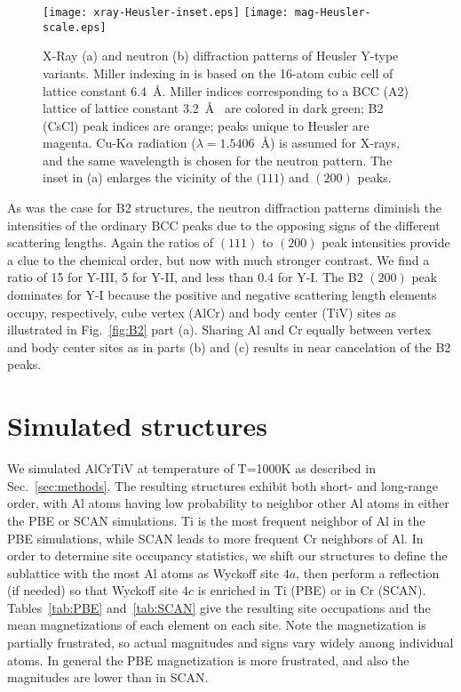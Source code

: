 \documentclass[twoside,12pt]{article}
\begin{document}
\begin{figure}[h!]
\texttt{[image: xray-Heusler-inset.eps]}
\texttt{[image: mag-Heusler-scale.eps]}
  \caption{\label{fig:Heusler} X-Ray (a) and neutron (b) diffraction patterns of Heusler Y-type variants. Miller indexing in is based on the 16-atom cubic cell of lattice constant 6.4~\AA. Miller indices corresponding to a BCC (A2) lattice of lattice constant 3.2~\AA~ are colored in dark green; B2 (CsCl) peak indices are orange; peaks unique to Heusler are magenta. Cu-K$\alpha$ radiation ($\lambda=1.5406$~\AA) is assumed for X-rays, and the same wavelength is chosen for the neutron pattern. The inset in (a) enlarges the vicinity of the $(111$) and $(200)$ peaks.}
\end{figure}

As was the case for B2 structures, the neutron diffraction patterns diminish the intensities of the ordinary BCC peaks due to the opposing signs of the different scattering lengths. Again the ratios of $(111)$ to $(200)$ peak intensities provide a clue to the chemical order, but now with much stronger contrast. We find a ratio of 15 for Y-III, 5 for Y-II, and less than 0.4 for Y-I. The B2 $(200)$ peak dominates for Y-I because the positive and negative scattering length elements occupy, respectively, cube vertex (AlCr) and body center (TiV) sites as illustrated in Fig.~\ref{fig:B2} part (a). Sharing Al and Cr equally between vertex and body center sites as in parts (b) and (c) results in near cancelation of the B2 peaks.


\section{Simulated structures}
\label{sec:sim}

We simulated AlCrTiV at temperature of T=1000K as described in Sec.~\ref{sec:methods}. The resulting structures exhibit both short- and long-range order, with Al atoms having low probability to neighbor other Al atoms in either the PBE or SCAN simulations. Ti is the most frequent neighbor of Al in the PBE simulations, while SCAN leads to more frequent Cr neighbors of Al. In order to determine site occupancy statistics, we shift our structures to define the sublattice with the most Al atoms as Wyckoff site $4a$, then perform a reflection (if needed) so that Wyckoff site $4c$ is enriched in Ti (PBE) or in Cr (SCAN). Tables~\ref{tab:PBE} and~\ref{tab:SCAN} give the resulting site occupations and the mean magnetizations of each element on each site. Note the magnetization is partially frustrated, so actual magnitudes and signs vary widely among individual atoms. In general the PBE magnetization is more frustrated, and also the magnitudes are lower than in SCAN.
\end{document}
